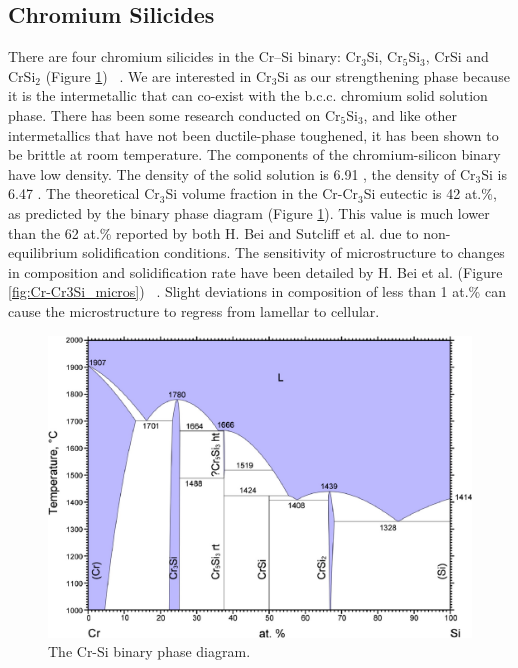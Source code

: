 \subsection{Chromium Silicides}
There are four chromium silicides in the Cr--Si binary: Cr$_3$Si, Cr$_5$Si$_3$, CrSi and CrSi$_2$ (Figure \ref{fig:CrSi}) ~\cite{gokhale90}.  We are interested in Cr$_3$Si as our strengthening phase because it is the intermetallic that can co-exist with the b.c.c. chromium solid solution phase. There has been some research conducted on Cr$_5$Si$_3$, and like other intermetallics that have not been ductile-phase toughened, it has been shown to be brittle at room temperature. The components of the chromium-silicon binary have low density. The density of the solid solution is 6.91 \gram\usk\centi\rpcubic\meter, the density of Cr$_3$Si is 6.47 \gram\usk\centi\rpcubic\meter.
The theoretical Cr$_3$Si volume fraction in the Cr-Cr$_3$Si eutectic is 42 at.\%, as predicted by the binary phase diagram (Figure \ref{fig:CrSi}). This value is much lower than the 62 at.\% reported by both H. Bei and Sutcliff et al. due to non-equilibrium solidification conditions. The sensitivity of microstructure to changes in composition and solidification rate have been detailed by H. Bei et al. (Figure \ref{fig:Cr-Cr3Si_micros}) ~\cite{bei03a}. Slight deviations in composition of less than 1 at.\% can cause the microstructure to regress from lamellar to cellular. 
%
\begin{figure}[H]
\begin{center}
\includegraphics[width=.8\textwidth]{CrSi}
\caption{The Cr-Si binary phase diagram.}\label{fig:CrSi}
\end{center}
\end{figure}
%
